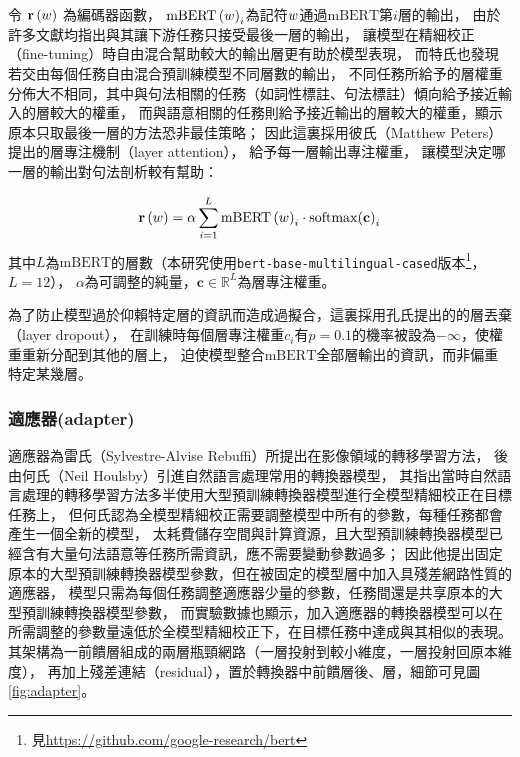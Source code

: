 令 $\mathbf{r}\left(w\right)$ 為編碼器函數，
$\mathrm{mBERT}\left(w\right)_{i}$為記符$w$通過$\mathrm{mBERT}$第$i$層的輸出，
由於許多文獻\cite{peters-etal-2018-deep,devlin-etal-2019-bert}均指出與其讓下游任務只接受最後一層的輸出，
讓模型在精細校正（fine-tuning）時自由混合幫助較大的輸出層更有助於模型表現，
而特氏也發現\cite{tenney-etal-2019-bert}若交由每個任務自由混合預訓練模型不同層數的輸出，
不同任務所給予的層權重分佈大不相同，其中與句法相關的任務（如詞性標註、句法標註）傾向給予接近輸入的層較大的權重，
而與語意相關的任務則給予接近輸出的層較大的權重，顯示原本只取最後一層的方法恐非最佳策略；
因此這裏採用彼氏（Matthew Peters）提出的層專注機制（layer attention），
給予每一層輸出專注權重，
讓模型決定哪一層的輸出對句法剖析較有幫助：

\begin{equation}
    \mathbf{r}\left(w\right) = \alpha \sum_{i=1}^{L} \mathrm{mBERT}\left(w\right)_{i} \cdot \mathrm{softmax} {\left(\mathbf{c}\right)}_{i}
\end{equation}
其中$L$為$\mathrm{mBERT}$的層數（本研究使用\texttt{bert-base-multilingual-cased}版本\footnote{見\url{https://github.com/google-research/bert}}，$L=12$），
$\alpha$為可調整的純量，$\mathbf{c} \in \mathbb{R}^{L}$為層專注權重。

為了防止模型過於仰賴特定層的資訊而造成過擬合，這裏採用孔氏提出的\cite{kondratyuk-straka-2019-75}的層丟棄（layer dropout），
在訓練時每個層專注權重$c_{i}$有$p=0.1$的機率被設為$-\infty$，使權重重新分配到其他的層上，
迫使模型整合$\mathrm{mBERT}$全部層輸出的資訊，而非偏重特定某幾層。

\subsubsection{適應器(adapter)}

適應器為雷氏（Sylvestre-Alvise Rebuffi）\cite{rebuffi2018efficient}所提出在影像領域的轉移學習方法，
後由何氏（Neil Houlsby）引進自然語言處理常用的轉換器模型\cite{houlsby2019parameter}，
其指出當時自然語言處理的轉移學習方法多半使用大型預訓練轉換器模型進行全模型精細校正在目標任務上，
但何氏認為全模型精細校正需要調整模型中所有的參數，每種任務都會產生一個全新的模型，
太耗費儲存空間與計算資源，且大型預訓練轉換器模型已經含有大量句法語意等任務所需資訊，應不需要變動參數過多；
因此他提出固定原本的大型預訓練轉換器模型參數，但在被固定的模型層中加入具殘差網路性質的適應器，
模型只需為每個任務調整適應器少量的參數，任務間還是共享原本的大型預訓練轉換器模型參數，
而實驗數據也顯示，加入適應器的轉換器模型可以在所需調整的參數量遠低於全模型精細校正下，在目標任務中達成與其相似的表現。
其架構為一前饋層組成的兩層瓶頸網路（一層投射到較小維度，一層投射回原本維度），
再加上殘差連結（residual），置於轉換器中前饋層後、層，細節可見圖\ref{fig:adapter}。

%

